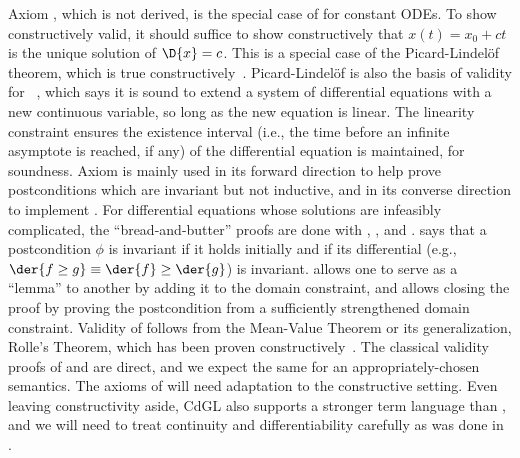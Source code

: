 \documentclass[12pt]{cmuthesis}
\theoremstyle{definition}
\theoremstyle{remark}
\newcommand{\rref}[2][]{\prettyref{#2}}
\newcommand{\CdGL}{\textsf{CdGL}\xspace}
\begin{document}
Axiom , which is not derived, is the special case of  for constant ODEs.
To show  constructively valid, it should suffice to show constructively that $x(t) = x_0 + ct$ is the unique solution of $\D{x}=c$.
This is a special case of the Picard-Lindel\"{o}f theorem, which is true constructively~\cite{DBLP:journals/corr/abs-1106-3448,Krebbers+Spitters:lmcs:corn:2011}.
Picard-Lindel\"{o}f is also the basis of validity for ~\cite{DBLP:conf/lics/PlatzerT18}, which says it is sound to extend a system of differential equations with a new continuous variable, so long as the new equation is linear.
The linearity constraint ensures the existence interval (i.e., the time before an infinite asymptote is reached, if any) of the differential equation is maintained, for soundness.
Axiom  is mainly used in its forward direction to help prove postconditions which are invariant but not inductive, and in its converse direction to implement .
For differential equations whose solutions are infeasibly complicated, the ``bread-and-butter'' proofs are done with , , and .
 says that a postcondition $\phi$ is invariant if it holds initially and if its differential (e.g., $\der{f\geq g} \equiv \der{f} \geq \der{g}$) is invariant.
 allows one  to serve as a ``lemma'' to another by adding it to the domain constraint, and  allows closing the proof by proving the postcondition from a sufficiently strengthened domain constraint.
Validity of  follows from the Mean-Value Theorem or its generalization, Rolle's Theorem, which has been proven constructively~\cite{DBLP:journals/corr/abs-1106-3448,Krebbers+Spitters:lmcs:corn:2011}.
The classical validity proofs of  and  are direct, and we expect the same for an appropriately-chosen semantics.
The axioms of \label{fig:diffeq-rules} will need adaptation to the constructive setting.
Even leaving constructivity aside, \CdGL also supports a stronger term language than \dGL, and we will need to treat continuity and differentiability carefully as was done in \rref{sec:definite-description}.
\end{document}
